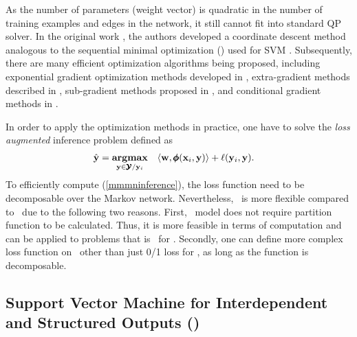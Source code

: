 {As the number of parameters (weight vector) is quadratic in the number of training examples and edges in the network, it still cannot fit into standard QP solver. 
In the original work \citep{Taskar04max}, the authors developed a coordinate descent method analogous to the sequential minimal optimization (\smo) used for SVM \citep{Platt98sequential,Platt99fast}.
Subsequently, there are many efficient optimization algorithms being proposed, including exponential gradient optimization methods developed in \citep{bartlett04}, extra-gradient methods described in \citep{taskar06}, sub-gradient methods proposed in \citep{Ratliff07}, and conditional gradient methods in \citep{rousu06, rousu07}.

In order to apply the optimization methods in practice, one have to solve the \textit{loss augmented} inference problem defined as
\begin{align}
	\hat{\mathbf {y}} = \underset{\mathbf {y}\in\pmb {\mathcal{Y}}/\mathbf {y}_i}{\textbf{argmax}} &\quad \langle \mathbf {w}, \pmb \phi(\mathbf {x}_i,\mathbf {y}) \rangle + \mathbf {\ell}(\mathbf {y}_i,\mathbf {y}) \label{mmmninference}.
\end{align} 
To efficiently compute (\ref{mmmninference}), the loss function need to be decomposable over the Markov network.
Nevertheless, \mmmn\ is more flexible compared to \crf\ due to the following two reasons.
First, \mmmn\ model does not require partition function to be calculated. 
Thus, it is more feasible in terms of computation and can be applied to problems that is \nphard\ for \crf.
Secondly, one can define more complex loss function on \mmmn\ other than just 0/1 loss for \crf, as long as the function is decomposable.





%
\subsection{Support Vector Machine for Interdependent and Structured Outputs (\svmstruct)}

}
